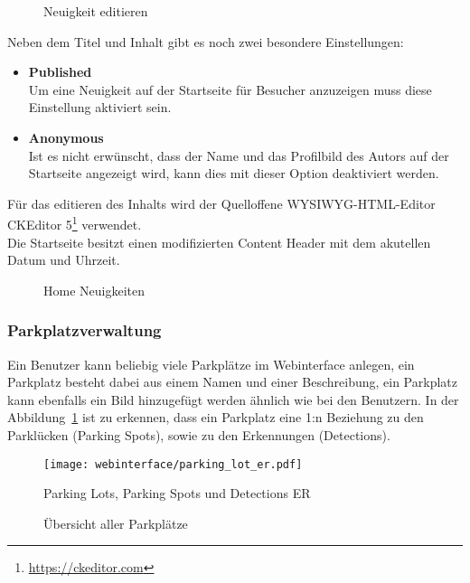 \begin{figure}[H]
  \centering
  \caption{Neuigkeit editieren}
\end{figure}

Neben dem Titel und Inhalt gibt es noch zwei besondere Einstellungen:

\begin{itemize}
  \item \textbf{Published}\\
  Um eine Neuigkeit auf der Startseite für Besucher anzuzeigen muss diese
  Einstellung aktiviert sein. 
  \item \textbf{Anonymous}\\
  Ist es nicht erwünscht, dass der Name und das Profilbild des Autors auf der
  Startseite angezeigt wird, kann dies mit dieser Option deaktiviert werden.
\end{itemize}

Für das editieren des Inhalts wird der Quelloffene \acs*{WYSIWYG}-HTML-Editor
CKEditor 5\footnote{\url{https://ckeditor.com}} verwendet.\\

Die Startseite besitzt einen modifizierten Content Header mit dem akutellen
Datum und Uhrzeit.

\begin{figure}[H]
  \centering
  \caption{Home Neuigkeiten}
\end{figure}

\subsubsection{Parkplatzverwaltung}
Ein Benutzer kann beliebig viele Parkplätze im Webinterface anlegen, ein
Parkplatz besteht dabei aus einem Namen und einer Beschreibung, ein Parkplatz
kann ebenfalls ein Bild hinzugefügt werden ähnlich wie bei den Benutzern. In der
Abbildung~\ref{fig:parking_lot_er} ist zu erkennen, dass ein Parkplatz eine 1:n
Beziehung zu den Parklücken (Parking Spots), sowie zu den Erkennungen
(Detections). 

\begin{figure}[H]
  \centering
  \texttt{[image: webinterface/parking\_lot\_er.pdf]}
  \caption{Parking Lots, Parking Spots und Detections ER}
  \label{fig:parking_lot_er}
\end{figure}

\begin{figure}[H]
  \centering
  \caption{Übersicht aller Parkplätze}
\end{figure}


